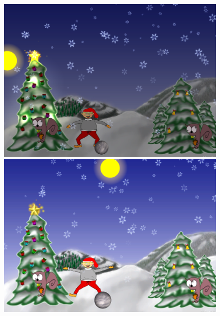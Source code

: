 \begin{figure}[htbp]\centering
	\begin{minipage}[b]{0.3\textwidth}\centering
		\includegraphics[width=1.00\textwidth]{Pictures/Design/time1.png} %
	\end{minipage}\hfill
	\begin{minipage}[b]{0.3\textwidth}\centering
		\includegraphics[width=1.00\textwidth]{Pictures/Design/time2.png} %
	\end{minipage}\hfill	
	\begin{minipage}[b]{0.3\textwidth}\centering

\end{minipage}
\end{figure}
